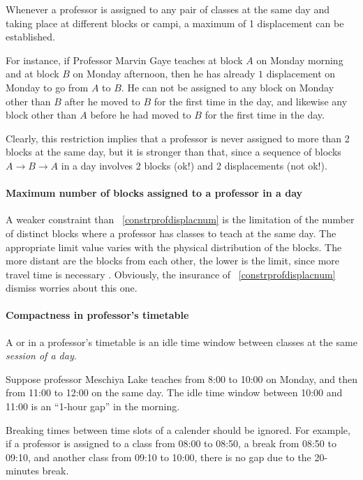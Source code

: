 Whenever a professor is assigned to any pair of classes at the same day and taking place at different blocks or campi, a maximum of 1 displacement can be established.

For instance, if Professor Marvin Gaye teaches at block $A$ on Monday morning and at block $B$ on Monday afternoon, then he has already $1$ displacement on Monday to go from $A$ to $B$. He can not be assigned to any block on Monday other than $B$ after he moved to $B$ for the first time in the day, and likewise any block other than $A$ before he had moved to $B$ for the first time in the day.

Clearly, this restriction implies that a professor is never assigned to more than 2 blocks at the same day, but it is stronger than that, since a sequence of blocks $A \rightarrow B \rightarrow A$ in a day involves 2 blocks (ok!) and 2 displacements (not ok!).


\paragraph{Maximum number of blocks assigned to a professor in a day}
\label{constrmaxblockprof}

A weaker constraint than ~\ref{constrprofdisplacnum} is the limitation of the number of distinct blocks where a professor has classes to teach at the same day. The appropriate limit value varies with the physical distribution of the blocks. The more distant are the blocks from each other, the lower is the limit, since more travel time is necessary . Obviously, the insurance of ~\ref{constrprofdisplacnum} dismiss worries about this one.


\paragraph{Compactness in professor's timetable}
\label{constrmingapprof}

A  or  in a professor's timetable is an idle time window between classes at the same \textit{session of a day}.

Suppose professor Meschiya Lake teaches from 8:00 to 10:00 on Monday, and then from 11:00 to 12:00 on the same day. The idle time window between 10:00 and 11:00 is an ``1-hour gap'' in the morning.

Breaking times between time slots of a calender should be ignored. For example, if a professor is assigned to a class from 08:00 to 08:50, a break from 08:50 to 09:10, and another class from 09:10 to 10:00, there is no gap due to the 20-minutes break.

